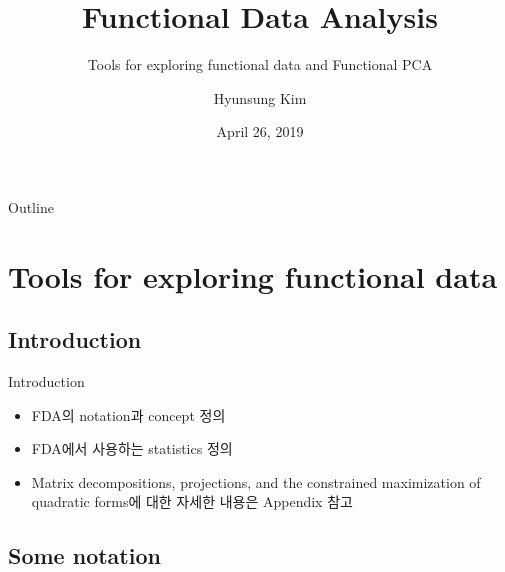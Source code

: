\documentclass{beamer}
\title{Functional Data Analysis}
\date[Short Occasion]{April 26, 2019}
\author{Hyunsung Kim}
\institute[Yaeji Lim's Lab]
	{Department of Statistics\\
	Chung-Ang University}
\subtitle{Tools for exploring functional data and Functional PCA}
\begin{document}
\begin{frame}
  \titlepage
\end{frame}

\begin{frame}{Outline}
  \tableofcontents
\end{frame}

\section{Tools for exploring functional data}

\subsection{Introduction}

\begin{frame}{Introduction}
  \begin{itemize}
  	\item {
	    FDA의 notation과 concept 정의
	}
	\item {
		FDA에서 사용하는 statistics 정의
	}
	\item {
		Matrix decompositions, projections, and the constrained maximization of quadratic forms에 대한 자세한 내용은 Appendix 참고
	}
  \end{itemize}
\end{frame}

\subsection{Some notation}
\end{document}
